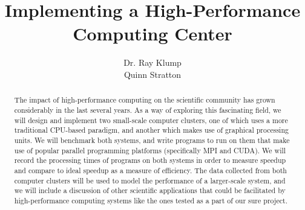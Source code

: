 \documentclass{article}
\title{Implementing a High-Performance Computing Center}
\author{Dr. Ray Klump\\Quinn Stratton}
\date{}
\begin{document}
\maketitle
\begin{abstract}
The impact of high-performance computing on the scientific community has grown considerably
in the last several years. As a way of exploring this fascinating field, we will design and
implement two small-scale computer clusters, one of which uses a more traditional CPU-based
paradigm, and another which makes use of graphical processing units. We will benchmark both
systems, and write programs to run on them that make use of popular parallel programming
platforms (specifically MPI and CUDA). We will record the processing times of programs on
both systems in order to measure speedup and compare to ideal speedup as a measure of
efficiency. The data collected from both computer clusters will be used to model the
performance of a larger-scale system, and we will include a discussion of other scientific
applications that could be facilitated by high-performance computing systems like the ones tested as a part of our sure project.
\end{abstract}
\end{document}
